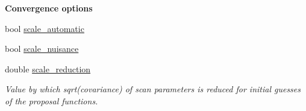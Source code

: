\begin{Indent}{\bf Convergence options}
\begin{DoxyCompactItemize}
bool \hyperlink{classeos_1_1MarkovChainSampler_1_1Config_a2a7cc53b4fff19248ccfcd187a6a394b}{scale\_\-automatic}
\item 
bool \hyperlink{classeos_1_1MarkovChainSampler_1_1Config_a8bf9b803f9b7995d7b6938347fa98165}{scale\_\-nuisance}
\item 
double \hyperlink{classeos_1_1MarkovChainSampler_1_1Config_aeaae399fa3b0a182dfd582f79529f7a5}{scale\_\-reduction}
\begin{DoxyCompactList}\small\item\em Value by which sqrt(covariance) of scan parameters is reduced for initial guesses of the proposal functions. \item\end{DoxyCompactList}\end{DoxyCompactItemize}
\end{Indent}
